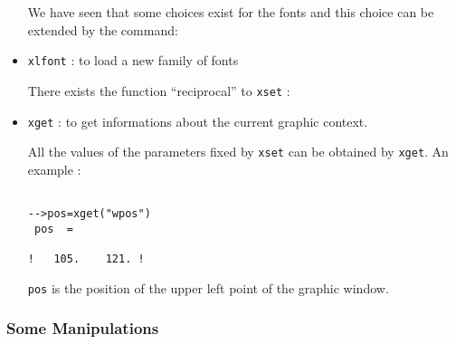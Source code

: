 \begin{itemize}
We have seen that some choices exist for the fonts and this choice can
be extended by the command:
        \item  {\tt xlfont}	: to load a new family of fonts 


There exists the function ``reciprocal'' to {\tt xset} :

	\item  {\tt xget}	: to get informations about the
	current graphic context.

All the values of the parameters fixed by {\tt xset} can be obtained by 
{\tt xget}. An example :

\begin{verbatim}

-->pos=xget("wpos")
 pos  =
 
!   105.    121. !

\end{verbatim}

{\tt pos} is the position of the upper left point of the graphic window.
\end{itemize}
%

\subsubsection{Some Manipulations}

